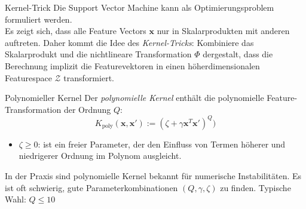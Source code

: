 \begin{defi}{Kernel-Trick}
    Die Support Vector Machine kann als Optimierungsproblem formuliert werden.\\
    Es zeigt sich, dass alle Feature Vectors $\mathbf{x}$ nur in Skalarprodukten mit anderen auftreten.
    Daher kommt die Idee des \emph{Kernel-Tricks}:
    Kombiniere das Skalarprodukt und die nichtlineare Transformation $\Phi$ dergestalt, dass die Berechnung implizit die Featurevektoren in einen höherdimensionalen Featurespace $\mathcal{Z}$ transformiert.
\end{defi}

\begin{defi}{Polynomieller Kernel}
    Der \emph{polynomielle Kernel} enthält die polynomielle Feature-Transformation der Ordnung $Q$:
    \[
        K_\text{poly}(\mathbf{x}, \mathbf{x}') := (\zeta + \gamma \mathbf{x}^T \mathbf{x}')^Q)
    \]
    \begin{itemize}
        \item $\zeta \geq 0$: ist ein freier Parameter, der den Einfluss von Termen höherer und niedrigerer Ordnung im Polynom ausgleicht.
    \end{itemize}

    In der Praxis sind polynomielle Kernel bekannt für numerische Instabilitäten. Es ist oft schwierig, gute Parameterkombinationen $(Q, \gamma, \zeta)$ zu finden.
    Typische Wahl: $Q \leq 10$
\end{defi}

